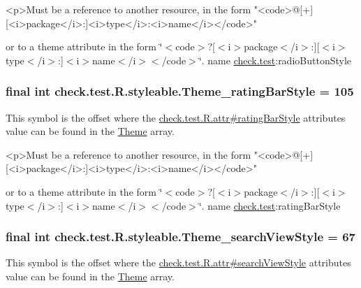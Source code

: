 \begin{DoxyVerb}      <p>Must be a reference to another resource, in the form "<code>@[+][<i>package</i>:]<i>type</i>:<i>name</i></code>"
\end{DoxyVerb}
 or to a theme attribute in the form \char`\"{}$<$code$>$?\mbox{[}$<$i$>$package$<$/i$>$\+:\mbox{]}\mbox{[}$<$i$>$type$<$/i$>$\+:\mbox{]}$<$i$>$name$<$/i$>$$<$/code$>$\char`\"{}.  name \hyperlink{namespacecheck_1_1test}{check.\+test}\+:radio\+Button\+Style \hypertarget{classcheck_1_1test_1_1_r_1_1styleable_ac5ebe24516424df00451d25bb71bf29c}{}
\subsubsection[{Theme\+\_\+rating\+Bar\+Style}]{\setlength{\rightskip}{0pt plus 5cm}final int check.\+test.\+R.\+styleable.\+Theme\+\_\+rating\+Bar\+Style = 105\hspace{0.3cm}{\ttfamily [static]}}\label{classcheck_1_1test_1_1_r_1_1styleable_ac5ebe24516424df00451d25bb71bf29c}
This symbol is the offset where the \hyperlink{classcheck_1_1test_1_1_r_1_1attr_a3caadf9d3a45df85bdd838e0a04dd32e}{check.\+test.\+R.\+attr\#rating\+Bar\+Style} attribute\textquotesingle{}s value can be found in the \hyperlink{classcheck_1_1test_1_1_r_1_1styleable_acca726d02016a0cf607782ec3a436a81}{Theme} array.

\begin{DoxyVerb}      <p>Must be a reference to another resource, in the form "<code>@[+][<i>package</i>:]<i>type</i>:<i>name</i></code>"
\end{DoxyVerb}
 or to a theme attribute in the form \char`\"{}$<$code$>$?\mbox{[}$<$i$>$package$<$/i$>$\+:\mbox{]}\mbox{[}$<$i$>$type$<$/i$>$\+:\mbox{]}$<$i$>$name$<$/i$>$$<$/code$>$\char`\"{}.  name \hyperlink{namespacecheck_1_1test}{check.\+test}\+:rating\+Bar\+Style \hypertarget{classcheck_1_1test_1_1_r_1_1styleable_adf1afa34cedcf221081b21bda1f70e5c}{}
\subsubsection[{Theme\+\_\+search\+View\+Style}]{\setlength{\rightskip}{0pt plus 5cm}final int check.\+test.\+R.\+styleable.\+Theme\+\_\+search\+View\+Style = 67\hspace{0.3cm}{\ttfamily [static]}}\label{classcheck_1_1test_1_1_r_1_1styleable_adf1afa34cedcf221081b21bda1f70e5c}
This symbol is the offset where the \hyperlink{classcheck_1_1test_1_1_r_1_1attr_a8569118fa0ad9dc50ad2d3035e843862}{check.\+test.\+R.\+attr\#search\+View\+Style} attribute\textquotesingle{}s value can be found in the \hyperlink{classcheck_1_1test_1_1_r_1_1styleable_acca726d02016a0cf607782ec3a436a81}{Theme} array.

